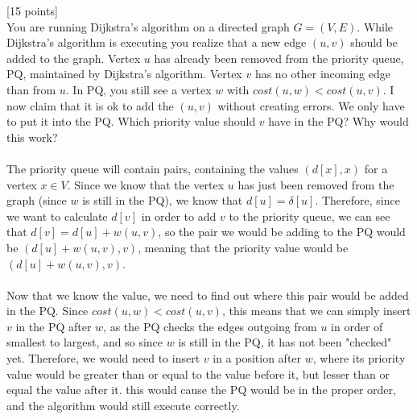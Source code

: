 \documentclass[12pt]{article}
\newcounter{ques}
\newenvironment{question}{\stepcounter{ques}{\noindent\bf Question \arabic{ques}:}}{\vspace{5mm}}
\begin{document}
	\begin{question}[15 points]\\

	You are running Dijkstra's algorithm on a directed graph $G =(V,E)$. While Dijkstra's algorithm is executing you realize that a new edge $(u,v)$ should be added to the graph. Vertex $u$ has already been removed from the priority queue, PQ, maintained by Dijkstra's algorithm. Vertex $v$ has no other incoming edge than from $u$. In PQ,   you still see a vertex $w$ with $cost(u,w) <  cost(u,v)$. I now claim that it is ok to add the
	 $(u,v)$ without creating errors. We only have to put it  into the PQ. Which priority value should $v$ have in the PQ? Why would this work?\\\\

  The priority queue will contain pairs, containing the values $(d[x], x)$ for a vertex $x\in V$. Since we know that the vertex $u$ has just been removed from the graph (since $w$ is still in the PQ), we know that $d[u]=\delta[u]$. Therefore, since we want to calculate $d[v]$ in order to add $v$ to the priority queue, we can see that $d[v] = d[u] + w(u,v)$, so the pair we would be adding to the PQ would be $(d[u]+w(u,v),v)$, meaning that the priority value would be $(d[u]+w(u,v),v)$.\\\\
  Now that we know the value, we need to find out where this pair would be added in the PQ. Since $cost(u,w)<cost(u,v)$, this means that we can simply insert $v$ in the PQ after $w$, as the PQ checks the edges outgoing from $u$ in order of smallest to largest, and so since $w$ is still in the PQ, it has not been "checked" yet. Therefore, we would need to insert $v$ in a position after $w$, where its priority value would be greater than or equal to the value before it, but lesser than or equal the value after it. this would cause the PQ would be in the proper order, and the algorithm would still execute correctly.

	\end{question}
\end{document}
